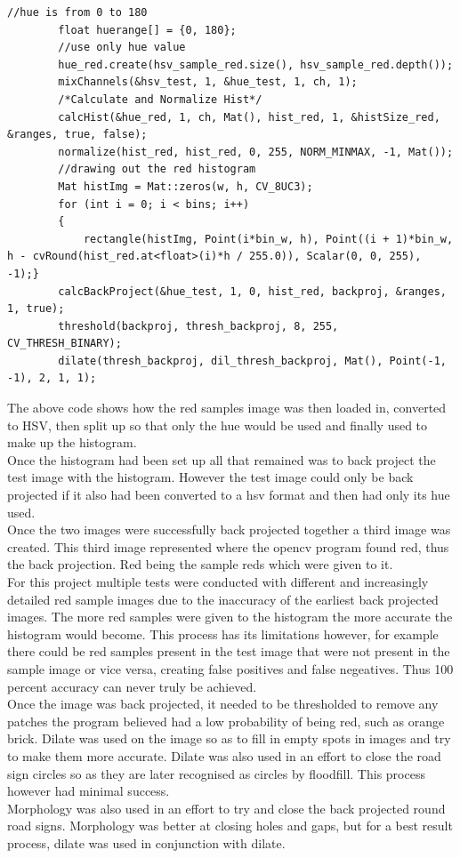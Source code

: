 \documentclass{article}
\begin{document}
\begin{lstlisting}
//hue is from 0 to 180
		float huerange[] = {0, 180};
		//use only hue value
		hue_red.create(hsv_sample_red.size(), hsv_sample_red.depth());
		mixChannels(&hsv_test, 1, &hue_test, 1, ch, 1);
		/*Calculate and Normalize Hist*/
		calcHist(&hue_red, 1, ch, Mat(), hist_red, 1, &histSize_red, &ranges, true, false);
		normalize(hist_red, hist_red, 0, 255, NORM_MINMAX, -1, Mat());
		//drawing out the red histogram
		Mat histImg = Mat::zeros(w, h, CV_8UC3);
		for (int i = 0; i < bins; i++)
		{
			rectangle(histImg, Point(i*bin_w, h), Point((i + 1)*bin_w, h - cvRound(hist_red.at<float>(i)*h / 255.0)), Scalar(0, 0, 255), -1);}
		calcBackProject(&hue_test, 1, 0, hist_red, backproj, &ranges, 1, true);	
		threshold(backproj, thresh_backproj, 8, 255, CV_THRESH_BINARY);
		dilate(thresh_backproj, dil_thresh_backproj, Mat(), Point(-1, -1), 2, 1, 1);
\end{lstlisting}
The above code shows how the red samples image was then loaded in, converted to HSV, then split up so that only the hue would be used and finally used to make up the histogram.\\
Once the histogram had been set up all that remained was to back project the test image with the histogram. However the test image could only be back projected if it also had been converted to a hsv format and then had only its hue used.\\ 
Once the two images were successfully back projected together a third image was created. This third image represented where the opencv program found red, thus the back projection. Red being the sample reds which were given to it. \\
For this project multiple tests were conducted with different and increasingly detailed red sample images due to the inaccuracy of the earliest back projected images. The more red samples were given to the histogram the more accurate the histogram would become. This process has its limitations however, for example there could be red samples present in the test image that were not present in the sample image or vice versa, creating false positives and false negeatives. Thus 100 percent accuracy can never truly be achieved. \\
Once the image was back projected, it needed to be thresholded to remove any patches the program believed had a low probability of being red, such as orange brick. Dilate was used on the image so as to fill in empty spots in images and try to make them more accurate. Dilate was also used in an effort to close the road sign circles so as they are later recognised as circles by floodfill. This process however had minimal success.\\
Morphology was also used in an effort to try and close the back projected round road signs. Morphology was better at closing holes and gaps, but for a best result process, dilate was used in conjunction with dilate.\\
\end{document}
